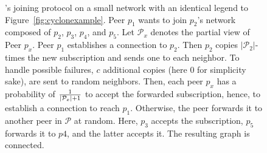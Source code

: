 \begin{figure}
  \centering
  
  \caption{\label{fig:scampexample} \SCAMP{}'s joining protocol on a small
    network with an identical legend to Figure~\ref{fig:cyclonexample}. Peer
    $p_1$ wants to join $p_2$'s network composed of $p_2$, $p_3$, $p_4$, and
    $p_5$. Let $\mathcal{P}_x$ denotes the partial view of Peer $p_x$. Peer
    $p_1$ establishes a connection to $p_2$. Then $p_2$ copies
    $|\mathcal{P}_2|$-times the new subscription and sends one to each
    neighbor. To handle possible failures, $c$ additional copies (here $0$ for
    simplicity sake), are sent to random neighbors. Then, each peer $p_x$ has
    a probability of $1\over{|\mathcal{P}_x|+1}$ to accept the forwarded
    subscription, hence, to establish a connection to reach $p_1$. Otherwise,
    the peer forwards it to another peer in $\mathcal{P}$ at random. Here,
    $p_3$ accepts the subscription, $p_5$ forwards it to $p4$, and the latter
    accepts it. The resulting graph is connected.}
\end{figure}

